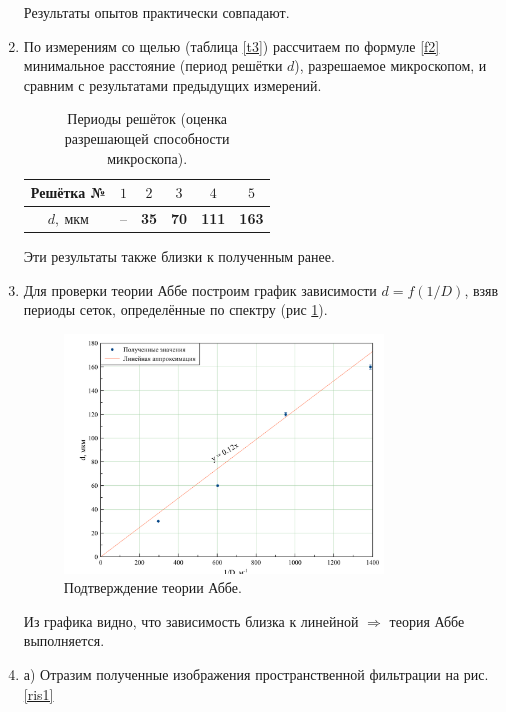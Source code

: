\documentclass[a4paper, 12pt, twoside]{article}
\begin{document}
\begin{enumerate}
	Результаты опытов практически совпадают.

	\item По измерениям со щелью (таблица \ref{t3}) рассчитаем по формуле \eqref{f2} минимальное расстояние (период решётки $d$), разрешаемое микроскопом, и сравним с результатами предыдущих измерений.
	
	\begin{table}[H]
		\centering
		\caption{Периоды решёток (оценка разрешающей способности микроскопа).}
		\label{t5}
		\begin{tabular}{c|c|c|c|c|c} \toprule
			Решётка №       & $1$ & $2$           & $3$         & $4$          &  $5$          \\ \midrule
			$d,~\text{мкм}$ & --  & \textbf{35} & \textbf{70} & \textbf{111} & \textbf{163} \\ \bottomrule
		\end{tabular}
	\end{table}

	Эти результаты также близки к полученным ранее.
	
	\item Для проверки теории Аббе построим график зависимости $d = f(1/D)$, взяв периоды сеток, определённые по спектру (рис \ref{itog}).
	
	\begin{figure}[H]
		\centering
		\includegraphics[width =  0.8\textwidth]{itog}
		\caption{Подтверждение теории Аббе.}
		\label{itog}
	\end{figure}

	Из графика видно, что зависимость близка к линейной $\Rightarrow$ теория Аббе выполняется.
	
	\item а) Отразим полученные изображения пространственной фильтрации на рис. \ref{ris1}
	

\end{enumerate}
\end{document}
